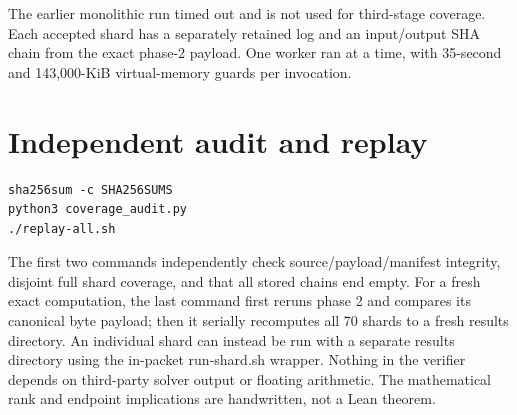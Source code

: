 \documentclass[11pt,letterpaper]{article}
\begin{document}
The earlier monolithic run timed out and is not used for third-stage
coverage. Each accepted shard has a separately retained log and an
input/output SHA chain from the exact phase-2 payload. One worker ran at
a time, with 35-second and 143,000-KiB virtual-memory guards per
invocation.

\section{Independent audit and
replay}\label{independent-audit-and-replay}

\begin{verbatim}
sha256sum -c SHA256SUMS
python3 coverage_audit.py
./replay-all.sh
\end{verbatim}

The first two commands independently check source/payload/manifest
integrity, disjoint full shard coverage, and that all stored chains end
empty. For a fresh exact computation, the last command first reruns
phase 2 and compares its canonical byte payload; then it serially
recomputes all 70 shards to a fresh results directory. An individual
shard can instead be run with a separate results directory using the
in-packet run-shard.sh wrapper. Nothing in the verifier depends on
third-party solver output or floating arithmetic. The mathematical rank
and endpoint implications are handwritten, not a Lean theorem.
\end{document}
